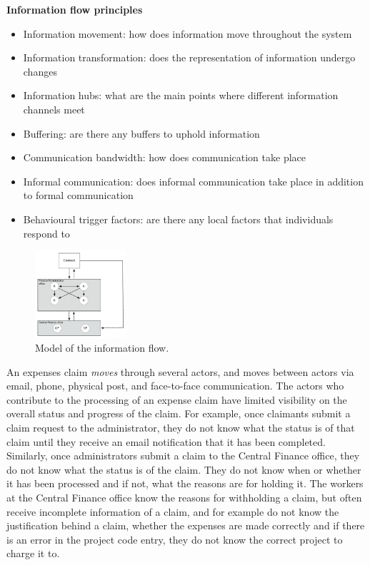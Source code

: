 \begin{framed}\noindent
\textbf{Information flow principles}
\begin{itemize}
\item Information movement: how does information move throughout the system
\item Information transformation: does the representation of information undergo changes
\item Information hubs: what are the main points where different information channels meet
\item Buffering: are there any buffers to uphold information
\item Communication bandwidth: how does communication take place
\item Informal communication: does informal communication take place in addition to formal communication
\item Behavioural trigger factors: are there any local factors that individuals respond to
\end{itemize}
\end{framed}

\begin{figure}[!ht]
\centering
\includegraphics[width=0.3\textwidth]{images/ch12/ch12_infmodel.pdf}
\caption[Study 2 Information flow model]{Model of the information flow.}
\vspace{-9pt}
\label{fig:ch12_infmod}
\end{figure}


An expenses claim \textit{moves} through several actors, and moves between actors via email, phone, physical post, and face-to-face communication. The actors who contribute to the processing of an expense claim have limited visibility on the overall status and progress of the claim. For example, once claimants submit a claim request to the administrator, they do not know what the status is of that claim until they receive an email notification that it has been completed. Similarly, once administrators submit a claim to the Central Finance office, they do not know what the status is of the claim. They do not know when or whether it has been processed and if not, what the reasons are for holding it. The workers at the Central Finance office know the reasons for withholding a claim, but often receive incomplete information of a claim, and for example do not know the justification behind a claim, whether the expenses are made correctly and if there is an error in the project code entry, they do not know the correct project to charge it to.

